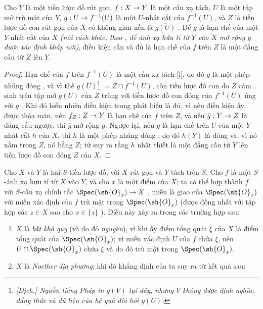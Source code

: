 \documentclass[oneside]{amsart}
\makeatletter
\newcommand{\ega@arrow}[2]{\mathchoice{#1}{#2}{#2}{#2}}
\renewcommand{\to}{\ega@arrow{\longrightarrow}{\rightarrow}}
\let\EGAOriginalLabel\label
\renewcommand{\label}[1]{\phantomsection\EGAOriginalLabel{#1}}
\makeatother
\begin{document}
\begin{corollary}[7.2.7]
\label{I.7.2.7}
Cho $Y$ là một tiền lược đồ rút gọn, $f:X\to Y$ là một cấu xạ tách, $U$ là một tập mở trù mật của $Y$, $g:U\to f^{-1}(U)$ là một $U$-nhát cắt của $f^{-1}(U)$, và $Z$ là tiền lược đồ con rút gọn của $X$ có không gian nền là $\overline{g(U)}$ .
Để $g$ là hạn chế của một $Y$-nhát cắt của $X$ \emph{(nói cách khác, theo , để ánh xạ hữu tỉ từ $Y$ vào $X$ mở rộng $g$ được xác định khắp nơi)}, điều kiện cần và đủ là hạn chế của $f$ trên $Z$ là một đẳng cấu từ $Z$ lên $Y$.
\end{corollary}

\begin{proof}
Hạn chế của $f$ trên $f^{-1}(U)$ là một cấu xạ tách [i], do đó $g$ là một phép nhúng đóng , và vì thế $g(U)$\footnote{\emph{[Dịch.] Nguồn tiếng Pháp in $g(V)$ tại đây, nhưng $V$ không được định nghĩa; đẳng thức và dữ liệu của hệ quả đòi hỏi $g(U)$.}} $=Z\cap f^{-1}(U)$, còn tiền lược đồ con do $Z$ cảm sinh trên tập mở $g(U)$ của $Z$ trùng với tiền lược đồ con đóng của $f^{-1}(U)$ ứng với $g$ .
Khi đó hiển nhiên điều kiện trong phát biểu là đủ, vì nếu điều kiện ấy được thỏa mãn, nếu $f_Z:Z\to Y$ là hạn chế của $f$ trên $Z$, và nếu $\overline{g}:Y\to Z$ là đẳng cấu ngược, thì $\overline{g}$ mở rộng $g$.
Ngược lại, nếu $g$ là hạn chế trên $U$ của một $Y$-nhát cắt $h$ của $X$, thì $h$ là một phép nhúng đóng ; do đó $h(Y)$ là đóng và, vì nó nằm trong $Z$, nó bằng $Z$; từ  suy ra rằng $h$ nhất thiết là một đẳng cấu từ $Y$ lên tiền lược đồ con đóng $Z$ của $X$.
\end{proof}

\begin{env}[7.2.8]
\label{I.7.2.8}
Cho $X$ và $Y$ là hai $S$-tiền lược đồ, với $X$ rút gọn và $Y$ tách trên $S$.
Cho $f$ là một $S$-ánh xạ hữu tỉ từ $X$ vào $Y$, và cho $x$ là một điểm của $X$; ta có thể hợp thành $f$ với $S$-cấu xạ chính tắc $\Spec(\sh{O}_x)\to X$ , miễn là giao của $\Spec(\sh{O}_x)$ với miền xác định của $f$ trù mật trong $\Spec(\sh{O}_x)$ (được đồng nhất với tập hợp các $z\in X$ sao cho $x\in\overline{\{z\}}$ ).
Điều này xảy ra trong các trường hợp sau:
\begin{enumerate}
  \item[1.º] $X$ là \emph{bất khả quy} (và do đó \emph{nguyên}), vì khi ấy điểm tổng quát $\xi$ của $X$ là điểm tổng quát của $\Spec(\sh{O}_x)$; vì miền xác định $U$ của $f$ chứa $\xi$, nên $U\cap\Spec(\sh{O}_x)$ chứa $\xi$ và do đó trù mật trong $\Spec(\sh{O}_x)$.
  \item[2.º] $X$ là \emph{Noether địa phương}; khi đó khẳng định của ta suy ra từ kết quả sau:
\end{enumerate}
\end{env}
\end{document}
